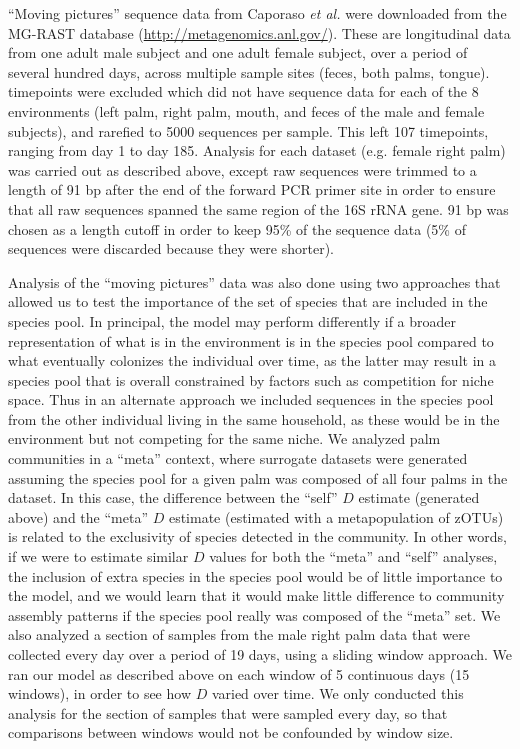 \documentclass{article}
\begin{document}
\par
“Moving pictures” sequence data from Caporaso \emph{et al.} \cite{Caporaso2011} were downloaded from the MG-RAST database (\url{http://metagenomics.anl.gov/}). These are longitudinal data from one adult male subject and one adult female subject, over a period of several hundred days, across multiple sample sites (feces, both palms, tongue). timepoints were excluded which did not have sequence data for each of the 8 environments (left palm, right palm, mouth, and feces of the male and female subjects), and rarefied to 5000 sequences per sample. This left 107 timepoints, ranging from day 1 to day 185. Analysis for each dataset (e.g. female right palm) was carried out as described above, except raw sequences were trimmed to a length of 91 bp after the end of the forward PCR primer site in order to ensure that all raw sequences spanned the same region of the 16S rRNA gene. 91 bp was chosen as a length cutoff in order to keep 95\% of the sequence data (5\% of sequences were discarded because they were shorter).
\par
Analysis of the “moving pictures” data was also done using two approaches that allowed us to test the importance of the set of species that are included in the species pool. In principal, the model may perform differently if a broader representation of what is in the environment is in the species pool compared to what eventually colonizes the individual over time, as the latter may result in a species pool that is overall constrained by factors such as competition for niche space. Thus in an alternate approach we included sequences in the species pool from the other individual living in the same household, as these would be in the environment but not competing for the same niche. We analyzed palm communities in a “meta” context, where surrogate datasets were generated assuming the species pool for a given palm was composed of all four palms in the dataset. In this case, the difference between the “self” \(D\) estimate (generated above) and the “meta” \(D\) estimate (estimated with a metapopulation of zOTUs) is related to the exclusivity of species detected in the community. In other words, if we were to estimate similar \(D\) values for both the “meta” and “self” analyses, the inclusion of extra species in the species pool would be of little importance to the model, and we would learn that it would make little difference to community assembly patterns if the species pool really was composed of the “meta” set. We also analyzed a section of samples from the male right palm data that were collected every day over a period of 19 days, using a sliding window approach. We ran our model as described above on each window of 5 continuous days (15 windows), in order to see how \(D\) varied over time. We only conducted this analysis for the section of samples that were sampled every day, so that comparisons between windows would not be confounded by window size.
\end{document}
